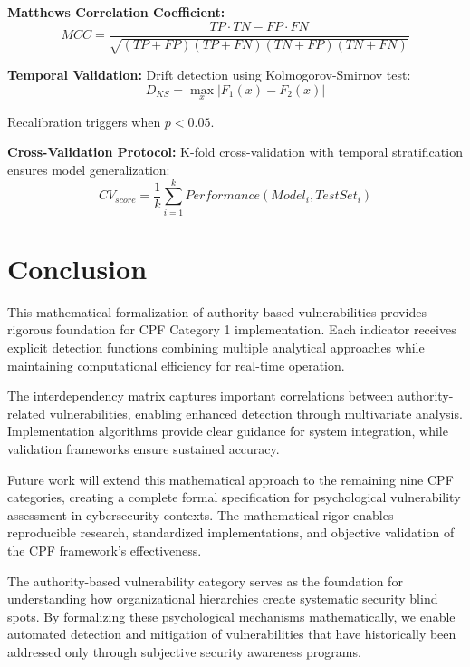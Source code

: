 \documentclass[11pt,a4paper]{article}
\begin{document}
\textbf{Matthews Correlation Coefficient:}
\begin{equation}
MCC = \frac{TP \cdot TN - FP \cdot FN}{\sqrt{(TP+FP)(TP+FN)(TN+FP)(TN+FN)}}
\end{equation}

\textbf{Temporal Validation:}
Drift detection using Kolmogorov-Smirnov test:
\begin{equation}
D_{KS} = \max_x |F_1(x) - F_2(x)|
\end{equation}

Recalibration triggers when $p < 0.05$.

\textbf{Cross-Validation Protocol:}
K-fold cross-validation with temporal stratification ensures model generalization:
\begin{equation}
CV_{score} = \frac{1}{k} \sum_{i=1}^{k} Performance(Model_i, TestSet_i)
\end{equation}

\section{Conclusion}

This mathematical formalization of authority-based vulnerabilities provides rigorous foundation for CPF Category 1 implementation. Each indicator receives explicit detection functions combining multiple analytical approaches while maintaining computational efficiency for real-time operation.

The interdependency matrix captures important correlations between authority-related vulnerabilities, enabling enhanced detection through multivariate analysis. Implementation algorithms provide clear guidance for system integration, while validation frameworks ensure sustained accuracy.

Future work will extend this mathematical approach to the remaining nine CPF categories, creating a complete formal specification for psychological vulnerability assessment in cybersecurity contexts. The mathematical rigor enables reproducible research, standardized implementations, and objective validation of the CPF framework's effectiveness.

The authority-based vulnerability category serves as the foundation for understanding how organizational hierarchies create systematic security blind spots. By formalizing these psychological mechanisms mathematically, we enable automated detection and mitigation of vulnerabilities that have historically been addressed only through subjective security awareness programs.
\end{document}
